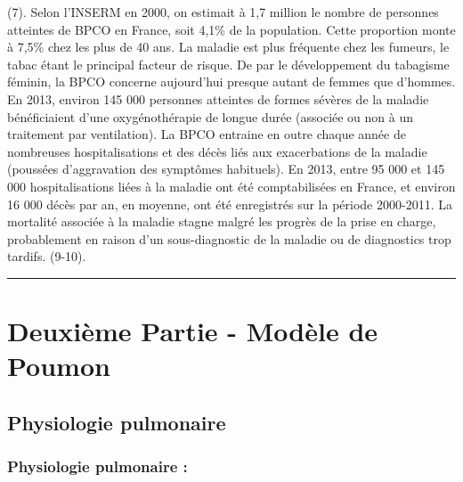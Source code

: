 \documentclass[12pt,]{article}
\begin{document}
(7). Selon l'INSERM en 2000, on estimait à 1,7 million le nombre de
personnes atteintes de BPCO en France, soit 4,1\% de la population.
Cette proportion monte à 7,5\% chez les plus de 40 ans. La maladie est
plus fréquente chez les fumeurs, le tabac étant le principal facteur de
risque. De par le développement du tabagisme féminin, la BPCO concerne
aujourd'hui presque autant de femmes que d'hommes. En 2013, environ 145
000 personnes atteintes de formes sévères de la maladie bénéficiaient
d'une oxygénothérapie de longue durée (associée ou non à un traitement
par ventilation). La BPCO entraine en outre chaque année de nombreuses
hospitalisations et des décès liés aux exacerbations de la maladie
(poussées d'aggravation des symptômes habituels). En 2013, entre 95 000
et 145 000 hospitalisations liées à la maladie ont été comptabilisées en
France, et environ 16 000 décès par an, en moyenne, ont été enregistrés
sur la période 2000-2011. La mortalité associée à la maladie stagne
malgré les progrès de la prise en charge, probablement en raison d'un
sous-diagnostic de la maladie ou de diagnostics trop tardifs. (9-10).

\pagebreak

\begin{center}\rule{0.5\linewidth}{0.5pt}\end{center}

\hypertarget{deuxiuxe8me-partie---moduxe8le-de-poumon}{%
\section{Deuxième Partie - Modèle de
Poumon}\label{deuxiuxe8me-partie---moduxe8le-de-poumon}}

\hypertarget{physiologie-pulmonaire}{%
\subsection{Physiologie pulmonaire}\label{physiologie-pulmonaire}}

\hypertarget{physiologie-pulmonaire-1}{%
\subsubsection{Physiologie pulmonaire
:}\label{physiologie-pulmonaire-1}}
\end{document}
